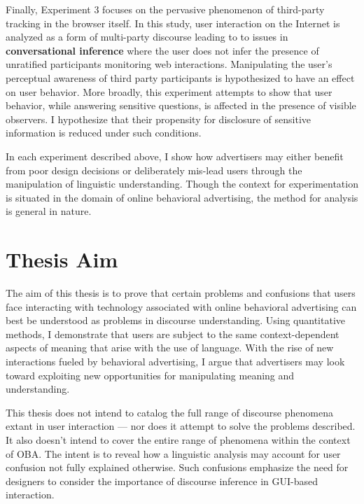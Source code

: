 Finally, Experiment 3 focuses on the pervasive phenomenon of third-party tracking in the browser itself. In this study, user interaction on the Internet is analyzed as a form of multi-party discourse leading to to issues in \textbf{conversational inference} where the user does not infer the presence of unratified participants monitoring web interactions. Manipulating the user's perceptual awareness of third party participants is hypothesized to have an effect on user behavior. More broadly, this experiment attempts to show that user behavior, while answering sensitive questions, is affected in the presence of visible observers. I hypothesize that their propensity for disclosure of sensitive information is reduced under such conditions.

In each experiment described above, I show how advertisers may either benefit from poor design decisions or deliberately mis-lead users through the manipulation of linguistic understanding. Though the context for experimentation is situated in the domain of online behavioral advertising, the method for analysis is general in nature. 

\section{Thesis Aim}
\label{thesisaim}

The aim of this thesis is to prove that certain problems and confusions that users face interacting with technology associated with online behavioral advertising can best be understood as problems in discourse understanding. Using quantitative methods, I demonstrate that users are subject to the same context-dependent aspects of meaning that arise with the use of language. With the rise of new interactions fueled by behavioral advertising, I argue that advertisers may look toward exploiting new opportunities for manipulating meaning and understanding.

This thesis does not intend to catalog the full range of discourse phenomena extant in user interaction --- nor does it attempt to solve the problems described. It also doesn't intend to cover the entire range of phenomena within the context of OBA. The intent is to reveal how a linguistic analysis may account for user confusion not fully explained otherwise. Such confusions emphasize the need for designers to consider the importance of discourse inference in GUI-based interaction.

